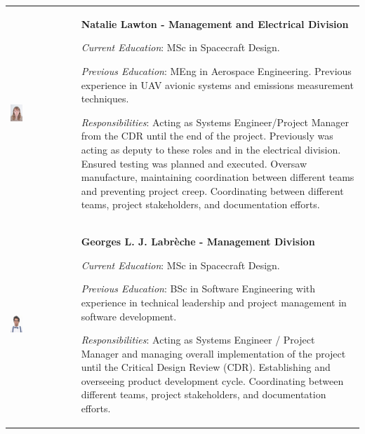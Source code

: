 

\begin{longtable}[]{m{} m{}}


\includegraphics[width=0.2\textwidth]{1-introduction/img/natalie-lawton.jpg} & \textbf{Natalie Lawton - Management and Electrical Division}

\smallskip
\textit{Current Education}: MSc in Spacecraft Design.

\smallskip
\textit{Previous Education}: MEng in Aerospace Engineering. Previous experience in UAV avionic systems and emissions measurement techniques.

\smallskip
\textit{Responsibilities}: Acting as  Systems Engineer/Project Manager from the CDR until the end of the project. Previously was acting as deputy to these roles and in the electrical division. Ensured testing was planned and executed. Oversaw manufacture, maintaining coordination between different teams and preventing project creep. Coordinating between different teams, project stakeholders, and documentation efforts. 
\bigskip
\\

 \includegraphics[width=0.2\textwidth]{1-introduction/img/georges-louis-joseph-labreche.jpg}  & \textbf{Georges L. J. Labrèche - Management Division}

\smallskip
\textit{Current Education}: MSc in Spacecraft Design.

\smallskip
\textit{Previous Education}: BSc in Software Engineering with experience in technical leadership and project management in software development.

\smallskip
\textit{Responsibilities}: Acting as Systems Engineer / Project Manager and managing overall implementation of the project until the Critical Design Review (CDR). Establishing and overseeing product development cycle. Coordinating between different teams, project stakeholders, and documentation efforts.                          
\bigskip
\\


\end{longtable}
